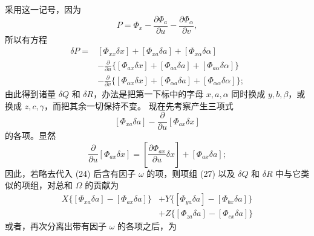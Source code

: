 \documentclass[11pt,a4paper,leqno]{article}
\begin{document}
采用这一记号，因为
\[
P=\Phi_x-\frac{\partial\Phi_a}{\partial u}
-\frac{\partial\Phi_\alpha}{\partial v},
\]
所以有方程
\[
\begin{aligned}
\delta P={}&[\Phi_{xx}\delta x]+[\Phi_{xa}\delta a]
+[\Phi_{x\alpha}\delta\alpha]\\
&-\frac{\partial}{\partial u}
\{[\Phi_{ax}\delta x]+[\Phi_{aa}\delta a]
+[\Phi_{a\alpha}\delta\alpha]\}\\
&-\frac{\partial}{\partial v}
\{[\Phi_{\alpha x}\delta x]+[\Phi_{\alpha a}\delta a]
+[\Phi_{\alpha\alpha}\delta\alpha]\};
\end{aligned}
\]
由此得到诸量 $\delta Q$ 和 $\delta R$，办法是把第一下标中的字母
$x,a,\alpha$ 同时换成 $y,b,\beta$，或换成 $z,c,\gamma$，而把其余一切保持不变。
现在先考察产生三项式
\begin{equation}\tag{27}
[\Phi_{xa}\delta a]-\frac{\partial}{\partial u}[\Phi_{ax}\delta x]
\end{equation}
的各项。显然
\[
\frac{\partial}{\partial u}[\Phi_{ax}\delta x]
=\left[\frac{\partial\Phi_{ax}}{\partial u}\delta x\right]
+[\Phi_{ax}\delta a];
\]
因此，若略去代入 (24) 后含有因子 $\omega$ 的项，则项组 (27) 以及
$\delta Q$ 和 $\delta R$ 中与它类似的项组，对总和 $\Omega$ 的贡献为
\[
\begin{aligned}
X\{[\Phi_{xa}\delta a]-[\Phi_{ax}\delta a]\}
&+Y\{[\Phi_{ya}\delta a]-[\Phi_{bx}\delta a]\}\\
&+Z\{[\Phi_{za}\delta a]-[\Phi_{cx}\delta a]\}
\end{aligned}
\]
或者，再次分离出带有因子 $\omega$ 的各项之后，为
\end{document}
